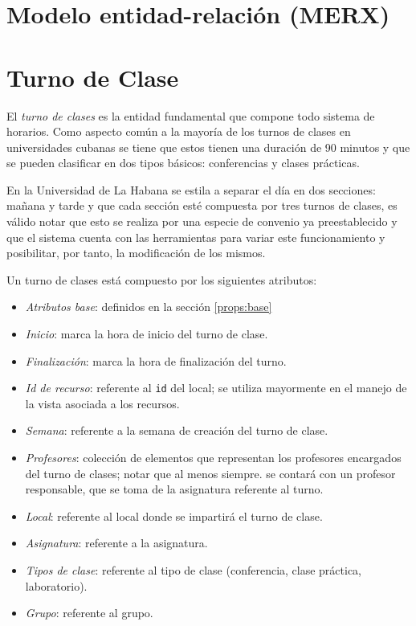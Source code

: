\section{Modelo entidad-relación (MERX)}


\section{Turno de Clase}
\label{sec:classes}

El \textit{turno de clases} es la entidad fundamental que compone todo sistema de horarios. Como aspecto común a la mayoría de los turnos de clases en universidades cubanas se tiene que estos tienen una duración de 90 minutos y que se pueden clasificar en dos tipos básicos: conferencias y clases prácticas.

En la Universidad de La Habana se estila a separar el día en dos secciones: mañana y tarde y que cada sección esté compuesta por tres turnos de clases, es válido notar que esto se realiza por una especie de convenio ya preestablecido y que el sistema cuenta con las herramientas para variar este funcionamiento y posibilitar, por tanto, la modificación de los mismos. 

Un turno de clases está compuesto por los siguientes atributos:
\begin{itemize}
	\item \textit{Atributos base}: definidos en la sección \ref{props:base}
	\item \textit{Inicio}: marca la hora de inicio del turno de clase.
	\item \textit{Finalización}: marca la hora de finalización del turno.
	\item \textit{Id de recurso}: referente al \texttt{id} del local; se utiliza mayormente en el manejo de la vista asociada a los recursos.
	\item \textit{Semana}: referente a la semana de creación del turno de clase.
	\item \textit{Profesores}: colección de elementos que representan los profesores encargados del turno de clases; notar que al menos siempre. se contará con un profesor responsable, que se toma de la asignatura referente al turno.\item \textit{Local}: referente al local donde se impartirá el turno de clase.
	\item \textit{Asignatura}: referente a la asignatura.
	\item \textit{Tipos de clase}: referente al tipo de clase (conferencia, clase práctica, laboratorio).
	\item \textit{Grupo}: referente al grupo.
\end{itemize}

